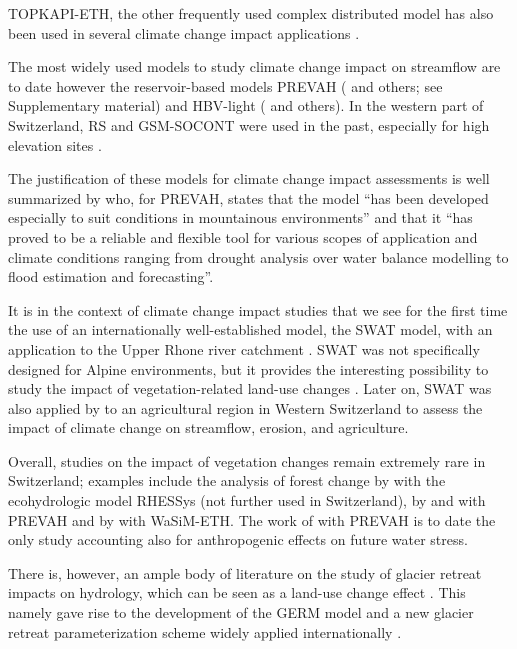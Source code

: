 \documentclass[10pt,a4paper]{article}
\begin{document}
TOPKAPI-ETH, the other frequently used complex distributed model has
also been used in several climate change impact
applications \citep{Fatichi2014,Fatichi2015,Finger_2012,Anghileri2018}. 

{The most widely used models to study climate change impact on
streamflow are to date however the reservoir-based models PREVAH
(}\citealt{Koplin2012,Bosshard2013a,Speich_2015,Junker_2014} and others; 
see Supplementary material) and HBV-light (\citealt{Etter2017,Hakala2020,Brunner_2018,Jenicek2018} 
and others). In the western part of
Switzerland, RS and GSM-SOCONT were used in the past, especially for
high elevation sites \citep{Horton2006,Uhlmann_2012,Uhlmann2013a,Terrier2015}.

The justification of these models for climate change impact assessments
is well summarized by \citet{K_plin_2010} who, for PREVAH, states that
the model ``has been developed especially to suit conditions in
mountainous environments'' and that it ``has proved to be a reliable and
flexible tool for various scopes of application and climate conditions
ranging from drought analysis over water balance modelling to flood
estimation and forecasting''. 

It is in the context of climate change impact studies that we see for
the first time the use of an internationally well-established model, the
SWAT model, with an application to the Upper Rhone river
catchment \citep{Rahman2014}. SWAT was not specifically designed for
Alpine environments, but it provides the interesting possibility to
study the impact of vegetation-related land-use
changes \citep{Rahman2015}. Later on, SWAT was also applied
by \citet{Zarrineh2020} to an agricultural region in Western Switzerland
to assess the impact of climate change on streamflow, erosion, and
agriculture.

Overall, studies on the impact of vegetation changes remain extremely
rare in Switzerland; examples include the analysis of forest change
by \citet{zierl05} with the ecohydrologic model RHESSys (not further
used in Switzerland), by \citet{Koplin2013} and \citet{Schattan2013} with
PREVAH and by \citet{Alaoui2014} with WaSiM-ETH. The work
of \citet{Milano2015a} with PREVAH is to date the only study accounting
also for anthropogenic effects on future water stress. 

There is, however, an ample body of literature on the study of glacier
retreat impacts on hydrology, which can be seen as a land-use change
effect \citep{Horton2006,Schaefli2007b,Finger2015,Etter2017,Addor2014,Junghans2011}. 
This namely gave rise to the development of
the GERM model \citep{Huss2016,Junghans2011,Farinotti2012,Finger2013} 
and a new glacier retreat parameterization scheme widely applied
internationally \citep{Huss2010}.
\end{document}

